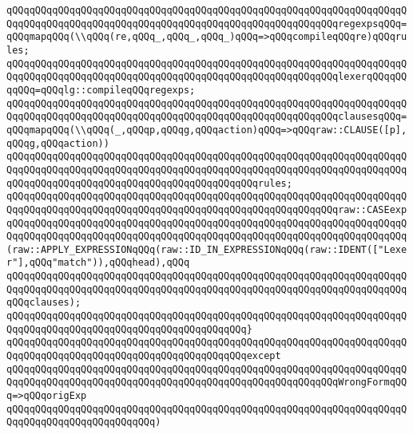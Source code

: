\newline
\verb|qQQqqQQqqQQqqQQqqQQqqQQqqQQqqQQqqQQqqQQqqQQqqQQqqQQqqQQqqQQqqQQqqQQqqQQqqQQqqQQqqQQqqQQqqQQqqQQqqQQqqQQqqQQqqQQqqQQqqQQqqQQqqQQqregexpsqQQq=qQQqmapqQQq(\\qQQq(re,qQQq_,qQQq_,qQQq_)qQQq=>qQQqcompileqQQqre)qQQqrules;|\newline
\verb|qQQqqQQqqQQqqQQqqQQqqQQqqQQqqQQqqQQqqQQqqQQqqQQqqQQqqQQqqQQqqQQqqQQqqQQqqQQqqQQqqQQqqQQqqQQqqQQqqQQqqQQqqQQqqQQqqQQqqQQqqQQqqQQqlexerqQQqqQQqqQQq=qQQqlg::compileqQQqregexps;|\newline
\newline
\verb|qQQqqQQqqQQqqQQqqQQqqQQqqQQqqQQqqQQqqQQqqQQqqQQqqQQqqQQqqQQqqQQqqQQqqQQqqQQqqQQqqQQqqQQqqQQqqQQqqQQqqQQqqQQqqQQqqQQqqQQqqQQqqQQqclausesqQQq=qQQqmapqQQq(\\qQQq(_,qQQqp,qQQqg,qQQqaction)qQQq=>qQQqraw::CLAUSE([p],qQQqg,qQQqaction))|\newline
\verb|qQQqqQQqqQQqqQQqqQQqqQQqqQQqqQQqqQQqqQQqqQQqqQQqqQQqqQQqqQQqqQQqqQQqqQQqqQQqqQQqqQQqqQQqqQQqqQQqqQQqqQQqqQQqqQQqqQQqqQQqqQQqqQQqqQQqqQQqqQQqqQQqqQQqqQQqqQQqqQQqqQQqqQQqqQQqqQQqqQQqqQQqrules;|\newline
\newline
\verb|qQQqqQQqqQQqqQQqqQQqqQQqqQQqqQQqqQQqqQQqqQQqqQQqqQQqqQQqqQQqqQQqqQQqqQQqqQQqqQQqqQQqqQQqqQQqqQQqqQQqqQQqqQQqqQQqqQQqqQQqqQQqqQQqraw::CASEexp|\newline
\verb|qQQqqQQqqQQqqQQqqQQqqQQqqQQqqQQqqQQqqQQqqQQqqQQqqQQqqQQqqQQqqQQqqQQqqQQqqQQqqQQqqQQqqQQqqQQqqQQqqQQqqQQqqQQqqQQqqQQqqQQqqQQqqQQqqQQqqQQqqQQq(raw::APPLY_EXPRESSIONqQQq(raw::ID_IN_EXPRESSIONqQQq(raw::IDENT(["Lexer"],qQQq"match")),qQQqhead),qQQq|\newline
\verb|qQQqqQQqqQQqqQQqqQQqqQQqqQQqqQQqqQQqqQQqqQQqqQQqqQQqqQQqqQQqqQQqqQQqqQQqqQQqqQQqqQQqqQQqqQQqqQQqqQQqqQQqqQQqqQQqqQQqqQQqqQQqqQQqqQQqqQQqqQQqqQQqclauses);|\newline
\verb|qQQqqQQqqQQqqQQqqQQqqQQqqQQqqQQqqQQqqQQqqQQqqQQqqQQqqQQqqQQqqQQqqQQqqQQqqQQqqQQqqQQqqQQqqQQqqQQqqQQqqQQqqQQqqQQq}|\newline
\verb|qQQqqQQqqQQqqQQqqQQqqQQqqQQqqQQqqQQqqQQqqQQqqQQqqQQqqQQqqQQqqQQqqQQqqQQqqQQqqQQqqQQqqQQqqQQqqQQqqQQqqQQqqQQqqQQqexcept|\newline
\verb|qQQqqQQqqQQqqQQqqQQqqQQqqQQqqQQqqQQqqQQqqQQqqQQqqQQqqQQqqQQqqQQqqQQqqQQqqQQqqQQqqQQqqQQqqQQqqQQqqQQqqQQqqQQqqQQqqQQqqQQqqQQqqQQqWrongFormqQQq=>qQQqorigExp|\newline
\verb|qQQqqQQqqQQqqQQqqQQqqQQqqQQqqQQqqQQqqQQqqQQqqQQqqQQqqQQqqQQqqQQqqQQqqQQqqQQqqQQqqQQqqQQqqQQqqQQq)|\newline
